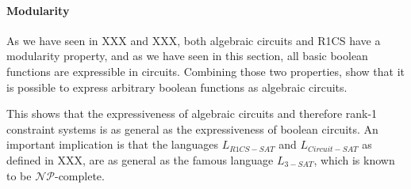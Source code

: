 \paragraph{Modularity} As we have seen in XXX and XXX, both algebraic circuits and R1CS have a modularity property, and as we have seen in this section, all basic boolean functions are expressible in circuits. Combining those two properties, show that it is possible to express arbitrary boolean functions as algebraic circuits.

This shows that the expressiveness of algebraic circuits and therefore rank-1 constraint systems is as general as the expressiveness of boolean circuits. An important implication is that the languages $L_{R1CS-SAT}$ and $L_{Circuit-SAT}$ as defined in XXX, are as general as the famous language $L_{3-SAT}$, which is known to be $\mathcal{NP}$-complete. 
